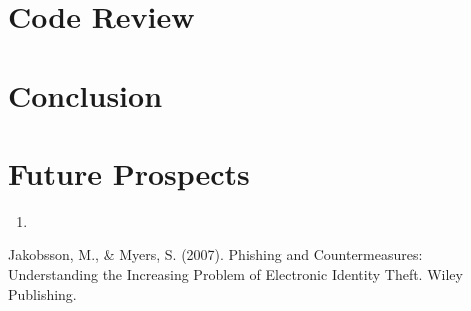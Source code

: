 \documentclass[openany]{report}
\begin{document}
\chapter{Code Review}

\chapter{Conclusion}

\chapter{Future Prospects}
\begin{enumerate}
    \item
\end{enumerate}

\clearpage
\begin{thebibliography}{10}
    Jakobsson, M., \& Myers, S. (2007). Phishing and Countermeasures: Understanding the Increasing Problem of Electronic Identity Theft. Wiley Publishing.

\end{thebibliography}
\end{document}
